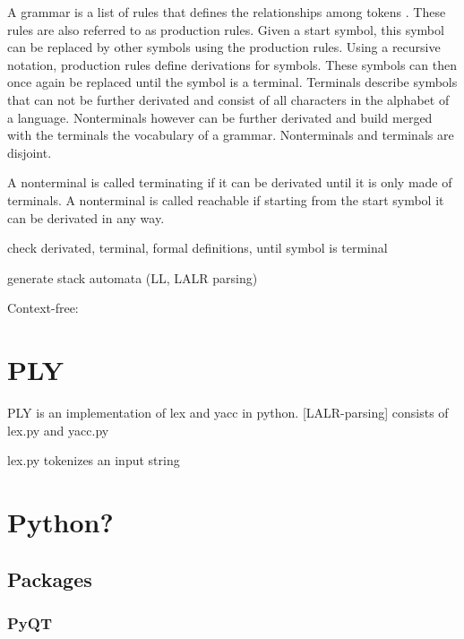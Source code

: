 A grammar is a list of rules that defines the relationships among tokens \cite{LexYacc.1992}.
These rules are also referred to as production rules.
Given a start symbol, this symbol can be replaced by other symbols using the production rules.
Using a recursive notation, production rules define derivations for symbols. These symbols can then once again be replaced until the symbol is a terminal.  
Terminals describe symbols that can not be further derivated and consist of all characters in the alphabet of a language.
Nonterminals however can be further derivated and build  merged with the terminals the vocabulary of a grammar. Nonterminals and terminals are disjoint. 

A nonterminal is called terminating if it can be derivated until it is only made of terminals.
A nonterminal is called reachable if starting from the start symbol it can be derivated in any way.

check derivated, terminal, formal definitions, until symbol is terminal


generate stack automata (LL, LALR parsing)

Context-free:


\section{PLY}\label{sec:BackgroundPLY}

\acf{PLY} \cite{PLY} is an implementation of lex and yacc in python.
[LALR-parsing]
consists of lex.py and yacc.py

lex.py tokenizes an input string


\section{Python?}\label{sec:BackgroundPython}
\subsection{Packages}\label{sec:BackgroundPackages}
\subsubsection{PyQT}\label{sec:BackgroundPyQT}